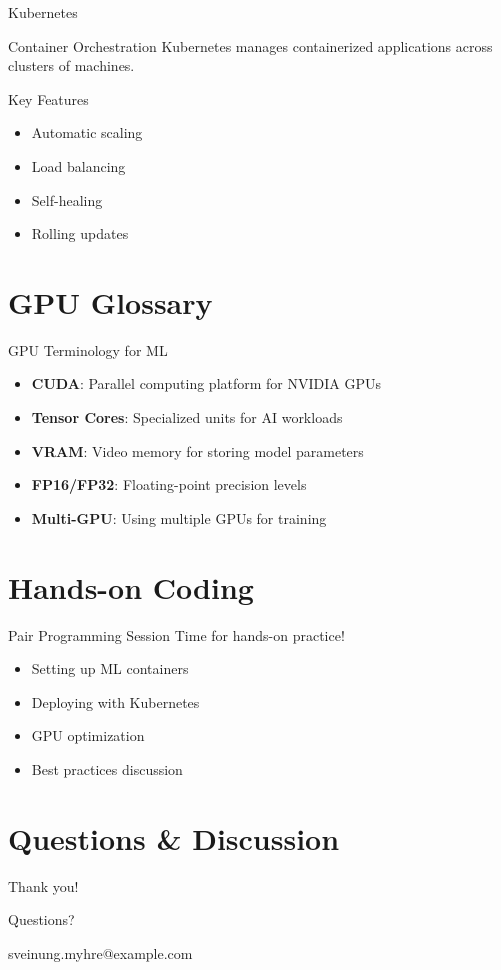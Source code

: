 \documentclass[11pt]{beamer}
\makeatletter
\newcommand{\email}{sveinung.myhre@example.com}
\makeatother
\begin{document}
\begin{frame}{Kubernetes}
    \begin{block}{Container Orchestration}
    Kubernetes manages containerized applications across clusters of machines.
    \end{block}

    \begin{block}{Key Features}
    \begin{itemize}
        \item Automatic scaling
        \item Load balancing
        \item Self-healing
        \item Rolling updates
    \end{itemize}
    \end{block}
\end{frame}

\section{GPU Glossary}

\begin{frame}{GPU Terminology for ML}
    \begin{itemize}
        \item \textbf{CUDA}: Parallel computing platform for NVIDIA GPUs
        \item \textbf{Tensor Cores}: Specialized units for AI workloads
        \item \textbf{VRAM}: Video memory for storing model parameters
        \item \textbf{FP16/FP32}: Floating-point precision levels
        \item \textbf{Multi-GPU}: Using multiple GPUs for training
    \end{itemize}
\end{frame}

\section{Hands-on Coding}

\begin{frame}{Pair Programming Session}
    Time for hands-on practice!

    \begin{itemize}
        \item Setting up ML containers
        \item Deploying with Kubernetes
        \item GPU optimization
        \item Best practices discussion
    \end{itemize}
\end{frame}

\section{Questions \& Discussion}

\begin{frame}

\begin{center}
    Thank you!

    Questions?

    \bigskip

    \email
\end{center}

\end{frame}
\end{document}
